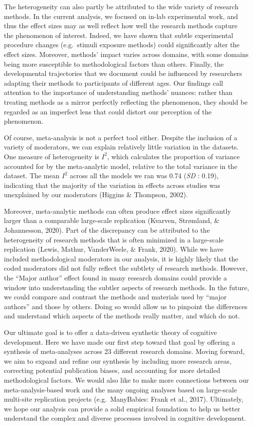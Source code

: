 \documentclass[10pt, letterpaper]{article}
\begin{document}
The heterogeneity can also partly be attributed to the wide variety of
research methods. In the current analysis, we focused on in-lab
experimental work, and thus the effect sizes may as well reflect how
well the research methods capture the phenomenon of interest. Indeed, we
have shown that subtle experimental procedure changes (e.g.~stimuli
exposure methods) could significantly alter the effect sizes. Moreover,
methods' impact varies across domains, with some domains being more
susceptible to methodological factors than others. Finally, the
developmental trajectories that we document could be influenced by
researchers adapting their methods to participants of different ages.
Our findings call attention to the importance of understanding methods'
nuances: rather than treating methods as a mirror perfectly reflecting
the phenomenon, they should be regarded as an imperfect lens that could
distort our perception of the phenomenon.

Of course, meta-analysis is not a perfect tool either. Despite the
inclusion of a variety of moderators, we can explain relatively little
variation in the datasets. One measure of heterogeneity is \(I^2\),
which calculates the proportion of variance accounted for by the
meta-analytic model, relative to the total variance in the dataset. The
mean \(I^2\) across all the models we ran was 0.74 (\emph{SD} : 0.19),
indicating that the majority of the variation in effects across studies
was unexplained by our moderators (Higgins \& Thompson, 2002).

Moreover, meta-analytic methods can often produce effect sizes
significantly larger than a comparable large-scale replication (Kvarven,
Strømland, \& Johannesson, 2020). Part of the discrepancy can be
attributed to the heterogeneity of research methods that is often
minimized in a large-scale replication (Lewis, Mathur, VanderWeele, \&
Frank, 2020). While we have included methodological moderators in our
analysis, it is highly likely that the coded moderators did not fully
reflect the subtlety of research methods. However, the ``Major author''
effect found in many research domains could provide a window into
understanding the subtler aspects of research methods. In the future, we
could compare and contrast the methods and materials used by ``major
authors'' and those by others. Doing so would allow us to pinpoint the
differences and understand which aspects of the methods really matter,
and which do not.

Our ultimate goal is to offer a data-driven synthetic theory of
cognitive development. Here we have made our first step toward that goal
by offering a synthesis of meta-analyses across 23 different research
domains. Moving forward, we aim to expand and refine our synthesis by
including more research areas, correcting potential publication biases,
and accounting for more detailed methodological factors. We would also
like to make more connections between our meta-analysis-based work and
the many ongoing analyses based on large-scale multi-site replication
projects (e.g.~ManyBabies: Frank et al., 2017). Ultimately, we hope our
analysis can provide a solid empirical foundation to help us better
understand the complex and diverse processes involved in cognitive
development.
\end{document}
